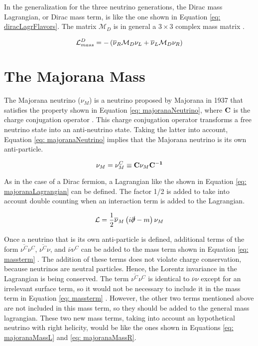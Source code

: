 In the generalization for the three neutrino generations, the Dirac mass Lagrangian, or Dirac mass term, is like the one shown in Equation \ref{eq: diracLagrFlavors}. The matrix $\mathcal{M}_{D}$ is in general a $3 \times 3$ complex mass matrix \cite{NeutrinoMass}.

\begin{equation}\label{eq: diracLagrFlavors}
\mathcal{L}_{mass}^{D} = -\left(\overline{\nu}_{R}\mathcal{M}_{D}\nu_{L} + \overline{\nu}_{L}\mathcal{M}_{D}\nu_{R}\right)
\end{equation}


\section{The Majorana Mass}

The Majorana neutrino ($\nu_{M}$) is a neutrino proposed by Majorana in 1937 that satisfies the property shown in Equation \ref{eq: majoranaNeutrino}, where $\mathbf{C}$ is the charge conjugation operator \cite{NeutrinoMass}. This charge conjugation operator transforms a free neutrino state into an anti-neutrino state. Taking the latter into account, Equation \ref{eq: majoranaNeutrino} implies that the Majorana neutrino is its own anti-particle. 

\begin{equation}\label{eq: majoranaNeutrino}
\nu_{M} = \nu^{C}_{M} \equiv \mathbf{C}\nu_{M}\mathbf{C^{-1}}
\end{equation}

As in the case of a Dirac fermion, a Lagrangian like the shown in Equation \ref{eq: majoranaLagrangian} can be defined. The factor 1/2 is added to take into account double counting when an interaction term is added to the Lagrangian.   

\begin{equation}\label{eq: majoranaLagrangian}
\mathcal{L} = \frac{1}{2}\overline{\nu}_{M}\left(i\slashed{\partial} - m\right)\nu_{M}
\end{equation}

Once a neutrino that is its own anti-particle is defined, additional terms of the form $\overline{\nu^{C}}\nu^{C}$, $\overline{\nu^{C}}\nu$, and $\overline{\nu}\nu^{C}$ can be added to the mass term shown in Equation \ref{eq: massterm} \cite{NeutrinoMass}. The addition of these terms does not violate charge conservation, because neutrinos are neutral particles. Hence, the Lorentz invariance in the Lagrangian is being conserved. The term $\overline{\nu^{C}}\nu^{C}$ is identical to $\overline{\nu}\nu$ except for an irrelevant surface term, so it would not be necessary to include it in the mass term in Equation \ref{eq: massterm} \cite{NeutrinoMass}. However, the other two terms mentioned above are not included in this mass term, so they should be added to the general mass lagrangian. These two new mass terms, taking into account an hypothetical neutrino with right helicity, would be like the ones shown in Equations \ref{eq: majoranaMassL} and \ref{eq: majoranaMassR}.

